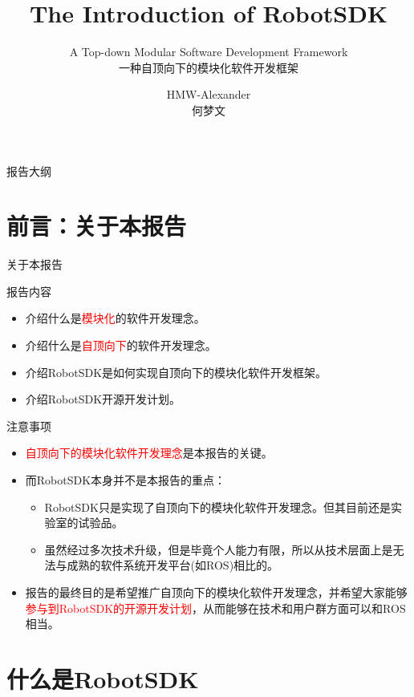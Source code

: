 \documentclass[9pt]{beamer}
\title{\textbf{The Introduction of RobotSDK}}
\subtitle{A Top-down Modular Software Development Framework\\一种自顶向下的模块化软件开发框架}
\author{HMW-Alexander\\何梦文}
\institute[CMU]{Carnegie Mellon University\\卡内基梅隆大学}
\begin{document}
	\maketitle
	
	\begin{frame}{报告大纲}
		\tableofcontents
	\end{frame}
	
	\section{前言：关于本报告}
	\begin{frame}{关于本报告}
		\begin{block}{报告内容}
			\begin{itemize}
				\item 介绍什么是\textcolor{red}{模块化}的软件开发理念。
				\item 介绍什么是\textcolor{red}{自顶向下}的软件开发理念。
				\item 介绍RobotSDK是如何实现自顶向下的模块化软件开发框架。
				\item 介绍RobotSDK开源开发计划。
			\end{itemize}
		\end{block}
		\pause
		\begin{block}{注意事项}
			\begin{itemize}
				\item \textcolor{red}{自顶向下的模块化软件开发理念}是本报告的关键。
				\item 而RobotSDK本身并不是本报告的重点：
				\begin{itemize}
					\item RobotSDK只是实现了自顶向下的模块化软件开发理念。但其目前还是实验室的试验品。
					\item 虽然经过多次技术升级，但是毕竟个人能力有限，所以从技术层面上是无法与成熟的软件系统开发平台(如ROS)相比的。
				\end{itemize}
				\item 报告的最终目的是希望推广自顶向下的模块化软件开发理念，并希望大家能够\textcolor{red}{参与到RobotSDK的开源开发计划}，从而能够在技术和用户群方面可以和ROS相当。
			\end{itemize}
		\end{block}
	\end{frame}
	
	\section{什么是RobotSDK}
\end{document}
